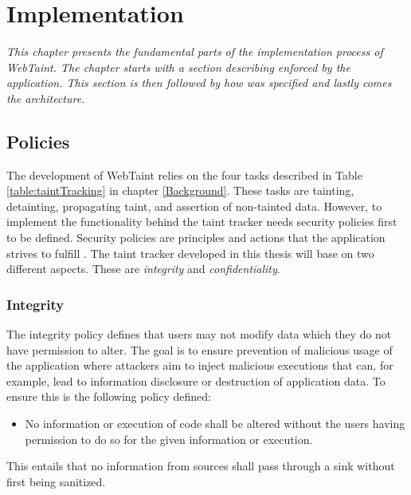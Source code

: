 \chapter{Implementation}
\label{Implementation}
\textit{This chapter presents the fundamental parts of the implementation process of WebTaint. The chapter starts with a section describing \textit{} enforced by the application. This section is then followed by how \textit{} was specified and lastly comes the \textit{} architecture.}



\section{Policies}
\label{Policies}
The development of WebTaint relies on the four tasks described in Table \ref{table:taintTracking} in chapter \ref{Background}. These tasks are tainting, detainting, propagating taint, and assertion of non-tainted data. However, to implement the functionality behind the taint tracker needs security policies first to be defined. Security policies are principles and actions that the application strives to fulfill \parencite{BayukJenniferL2012Cspg}. The taint tracker developed in this thesis will base on two different aspects. These are \textit{integrity} and \textit{confidentiality}.



\subsection{Integrity}
\label{Integrity}
The integrity policy defines that users may not modify data which they do not have permission to alter. The goal is to ensure prevention of malicious usage of the application where attackers aim to inject malicious executions that can, for example, lead to information disclosure or destruction of application data. To ensure this is the following policy defined:

\hfill
\begin{itemize}
    \item No information or execution of code shall be altered without the users having permission to do so for the given information or execution.
\end{itemize}
\hfill

This entails that no information from sources shall pass through a sink without first being sanitized.



